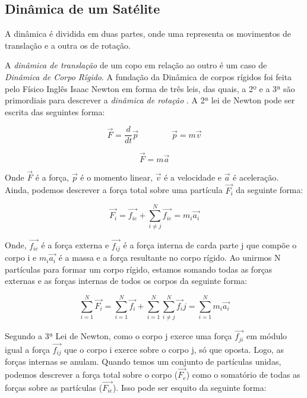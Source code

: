 
\subsection{Dinâmica de um Satélite}\label{cap:dinamica}

A dinâmica é dividida em duas partes, onde uma representa os movimentos de translação e a outra os de rotação.

A \textit{dinâmica de translação} de um copo em relação ao outro é um caso de \textit{Dinâmica de Corpo Rígido}. A fundação da Dinâmica de corpos rígidos foi feita pelo Físico Inglês Isaac Newton em forma de três leis, das quais, a 2º e a 3ª são primordiais para descrever a \textit{dinâmica de rotação} \cite{Snider}. A 2ª lei de Newton pode ser escrita das seguintes forma:

\begin{equation}\label{eq:fma}
  \vec{F}=\frac{d}{dt}\vec{p}\quad\quad\quad\quad\vec{p}=m\vec{v}
\end{equation}

\begin{equation}
  \vec{F}=m\vec{a}
\end{equation}

Onde $\vec{F}$ é a força, $\vec{p}$ é o momento linear, $\vec{v}$ é a velocidade e $\vec{a}$ é  aceleração. Ainda, podemos descrever a força total sobre uma partícula $\vec{F_i}$ da seguinte forma:

\begin{equation}\label{eq:Fi}
\vec{F_i}=\vec{f_{ie}}+\sum_{i\neq j}^{N}{\vec{f_{ie}}} = m_i\vec{a_i}
\end{equation}
 
 Onde, $\vec{f_{ie}}$ é a força externa e $\vec{f_{ij}}$ é a força interna de carda parte j que compõe o corpo i e $m_i\vec{a_i}$ é a massa e a força resultante no corpo rígido. Ao unirmos N partículas para formar um corpo rígido, estamos somando todas as forças externas e as forças internas de todos os corpos da seguinte forma:

\begin{equation}
  \sum_{i=1}^{N}{\vec{F_i}}=\sum_{i=1}^{N}{\vec{f_i}}+\sum_{i=1}^{N}{\sum_{i\neq j}^{N}{\vec{f_i}j=}}\sum_{i=1}^{N}{m_i\vec{a_i}} 
\end{equation}

Segundo a 3ª Lei de Newton, como o corpo j exerce uma força $\vec{f_{ji}}$ em módulo igual a força $\vec{f_{ij}}$ que o corpo i exerce sobre o corpo j, só que oposta. Logo, as forças internas se anulam. Quando temos um conjunto de partículas unidas, podemos descrever a força total sobre o corpo ($\vec{F_e}$) como o somatório de todas as forças sobre as partículas ($\vec{F_{ie}}$). Isso pode ser esquito da seguinte forma:

